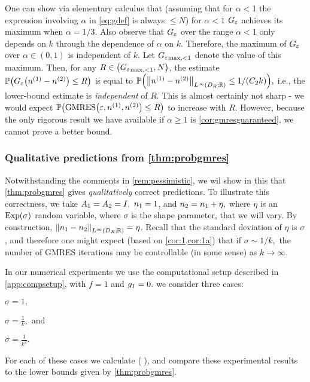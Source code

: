 One can show via elementary calculus that (assuming that for $\alpha < 1$ the expression involving $\alpha$ in \cref{eq:gdef} is always $\leq N$) for $\alpha < 1$ $G_{\varepsilon}$ achieves its maximum when $\alpha = 1/3$. Also observe that $G_{\varepsilon}$ over the range $\alpha < 1$ only depends on $k$ through the dependence of $\alpha$ on $k.$ Therefore, the maximum of $G_{\varepsilon}$ over $\alpha \in (0,1)$ is independent of $k.$ Let ${G_{\varepsilon}}_{\max,<1}$ denote the value of this maximum. Then, for any $R \in \mleft(\Gfnmaxlo,N\mright)$, the estimate $\PP\mleft(\Gfn{\nso-\nst} \leq R\mright)$ is equal to $\PP\mleft(\NLiDRRR{\nso-\nst} \leq 1/\mleft(\Ct k\mright)\mright),$ i.e., the lower-bound estimate is \emph{independent} of $R$. This is almost certainly not sharp - we would expect $\PP\mleft(\GMRES{\eps}{\nso}{\nst} \leq R\mright)$ to increase with $R$. However, because the only rigorous result we have available if $\alpha \geq 1$ is \cref{cor:gmresguaranteed}, we cannot prove a better bound.
\ere

\subsubsection{Qualitative predictions from \cref{thm:probgmres}}\label{sec:qualgmres}

Notwithstanding the comments in \cref{rem:pessimistic}, we wil show in this  that \cref{thm:probgmres} gives \emph{qualitatively} correct predictions. To illustrate this correctness, we take $A_{1}=A_{2}=I,$ $n_{1} =1$, and $n_{2} = n_{1} + \eta,$ where $\eta$ is an $\Exp{\sigma}$ random variable, where $\sigma$ is the shape parameter, that we will vary. By construction, $\NLiDRRR{\no-\nt} = \eta$. Recall that the standard deviation of $\eta$ is $\sigma$, and therefore one might expect (based on \cref{cor:1,cor:1a}) that if $\sigma \sim 1/k,$ the number of GMRES iterations may be controllable (in some sense) as $k \rightarrow \infty.$

In our numerical experiments we use the computational setup described in \cref{app:compsetup}, with $f=1$ and $g_{I}=0.$ we consider three cases:
\ben
\item\label{it:sigma1} $\displaystyle \sigma  = 1,$
\item\label{it:sigma2} $\displaystyle \sigma  = \frac{1}k,$ and
  \item\label{it:sigma3} $\displaystyle \sigma  = \frac{1}{k^2}.$
    \een

    For each of these cases we calculate
    \beq\label{eq:gmresprob}
    \PP\mleft(\GMRES{\eps}{\no}{\nt} \mright),
    \eeq
     and compare these experimental results to the lower bounds given by \cref{thm:probgmres}.

